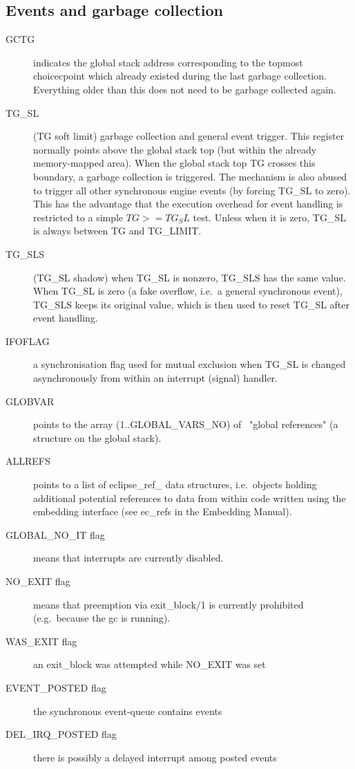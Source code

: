 \subsection{Events and garbage collection}
\begin{description}
\item[GCTG] indicates the global stack address corresponding to the
        topmost choicecpoint which already existed
        during the last garbage collection. Everything older than this
        does not need to be garbage collected again.
\item[TG_SL] (TG soft limit) garbage collection and general event trigger.
        This register normally points above the global stack top
        (but within the already memory-mapped area). When the global stack
        top TG crosses this boundary, a garbage collection is triggered.
        The mechanism is also abused to trigger all other synchronous
        engine events (by forcing TG_SL to zero).
        This has the advantage that the execution overhead
        for event handling is restricted to a simple $TG >= TG_SL$ test.
        Unless when it is zero, TG_SL is always between TG and TG_LIMIT.
\item[TG_SLS] (TG_SL shadow) when TG_SL is nonzero, TG_SLS has the same value.
        When TG_SL is zero (a fake overflow, i.e.\ a general synchronous event),
        TG_SLS keeps its original value, which is then used to reset TG_SL
        after event handling.
\item[IFOFLAG] a synchronisation flag used for mutual exclusion when
        TG_SL is changed asynchronously from within an interrupt (signal)
        handler.
\item[GLOBVAR] points to the array (1..GLOBAL_VARS_NO) of \eclipse\
        "global references" (a structure on the global stack).
\item[ALLREFS] points to a list of eclipse_ref_ data structures, i.e.\
        objects holding additional potential references to {\eclipse} data
        from within code written using the embedding interface
        (see ec_refs in the Embedding Manual).
\item[GLOBAL_NO_IT flag] means that interrupts are currently disabled.
\item[NO_EXIT flag] means that preemption via exit_block/1 is currently
        prohibited (e.g.\ because the gc is running).
\item[WAS_EXIT flag] an exit_block was attempted while NO_EXIT was set
\item[EVENT_POSTED flag] the synchronous event-queue contains events
\item[DEL_IRQ_POSTED flag] there is possibly a delayed interrupt among
        posted events
\end{description}


